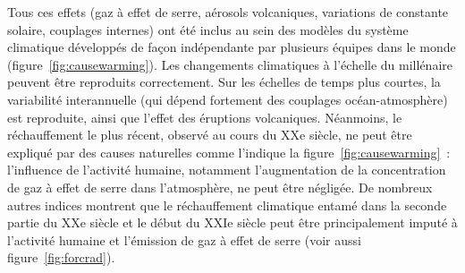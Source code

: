 \sk
Tous ces effets (gaz à effet de serre, aérosols volcaniques, variations de constante solaire, couplages internes) ont été inclus au sein des modèles du système climatique développés de façon indépendante par plusieurs équipes dans le monde (figure~\ref{fig:causewarming}). Les changements climatiques à l'échelle du millénaire peuvent être reproduits correctement. Sur les échelles de temps plus courtes, la variabilité interannuelle (qui dépend fortement des couplages océan-atmosphère) est reproduite, ainsi que l'effet des éruptions volcaniques. Néanmoins, le réchauffement le plus récent, observé au cours du XXe siècle, ne peut être expliqué par des causes naturelles comme l'indique la figure~\ref{fig:causewarming}~: l'influence de l'activité humaine, notamment l'augmentation de la concentration de gaz à effet de serre dans l'atmosphère, ne peut être négligée. De nombreux autres indices montrent que le réchauffement climatique entamé dans la seconde partie du XXe siècle et le début du XXIe siècle peut être principalement imputé à l'activité humaine et l'émission de gaz à effet de serre (voir aussi figure~\ref{fig:forcrad}).



